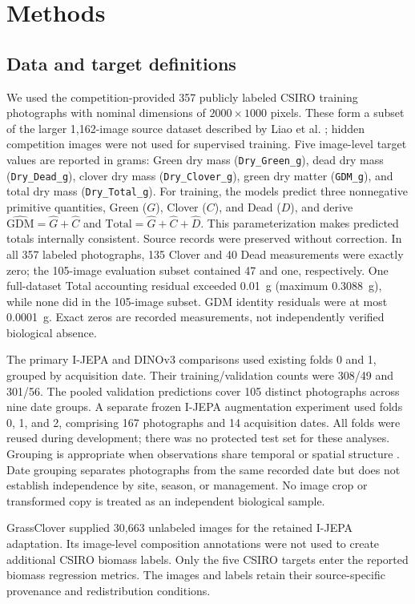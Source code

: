 \documentclass[pdflatex,a4paper,sn-nature]{sn-jnl}
\begin{document}
\section{Methods}
\subsection{Data and target definitions}
We used the competition-provided 357 publicly labeled CSIRO training photographs with nominal dimensions of $2000\times1000$ pixels. These form a subset of the larger 1,162-image source dataset described by Liao et al. \cite{Liao2025PastureDataset}; hidden competition images were not used for supervised training. Five image-level target values are reported in grams: Green dry mass (\texttt{Dry\_Green\_g}), dead dry mass (\texttt{Dry\_Dead\_g}), clover dry mass (\texttt{Dry\_Clover\_g}), green dry matter (\texttt{GDM\_g}), and total dry mass (\texttt{Dry\_Total\_g}). For training, the models predict three nonnegative primitive quantities, Green ($G$), Clover ($C$), and Dead ($D$), and derive $\widehat{\mathrm{GDM}}=\hat G+\hat C$ and $\widehat{\mathrm{Total}}=\hat G+\hat C+\hat D$. This parameterization makes predicted totals internally consistent. Source records were preserved without correction. In all 357 labeled photographs, 135 Clover and 40 Dead measurements were exactly zero; the 105-image evaluation subset contained 47 and one, respectively. One full-dataset Total accounting residual exceeded 0.01~g (maximum 0.3088~g), while none did in the 105-image subset. GDM identity residuals were at most 0.0001~g. Exact zeros are recorded measurements, not independently verified biological absence.

The primary I-JEPA and DINOv3 comparisons used existing folds 0 and 1, grouped by acquisition date. Their training/validation counts were 308/49 and 301/56. The pooled validation predictions cover 105 distinct photographs across nine date groups. A separate frozen I-JEPA augmentation experiment used folds 0, 1, and 2, comprising 167 photographs and 14 acquisition dates. All folds were reused during development; there was no protected test set for these analyses. Grouping is appropriate when observations share temporal or spatial structure \cite{roberts2017crossvalidation}. Date grouping separates photographs from the same recorded date but does not establish independence by site, season, or management. No image crop or transformed copy is treated as an independent biological sample.

GrassClover supplied 30,663 unlabeled images for the retained I-JEPA adaptation. Its image-level composition annotations were not used to create additional CSIRO biomass labels. Only the five CSIRO targets enter the reported biomass regression metrics. The images and labels retain their source-specific provenance and redistribution conditions.
\end{document}
